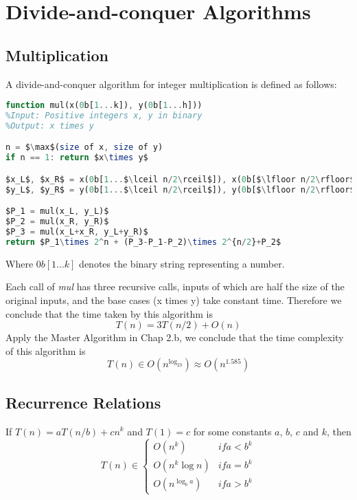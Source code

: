 \section{Divide-and-conquer Algorithms}

\subsection{Multiplication}

\begin{definition}
A divide-and-conquer algorithm for integer multiplication is defined as follows:
\begin{lstlisting}[mathescape=true, language=Octave]
function mul(x(0b[1...k]), y(0b[1...h]))
%Input: Positive integers x, y in binary
%Output: x times y

n = $\max$(size of x, size of y)
if n == 1: return $x\times y$

$x_L$, $x_R$ = x(0b[1...$\lceil n/2\rceil$]), x(0b[$\lfloor n/2\rfloor$...n])
$y_L$, $y_R$ = y(0b[1...$\lceil n/2\rceil$]), y(0b[$\lfloor n/2\rfloor$...n])

$P_1 = mul(x_L, y_L)$
$P_2 = mul(x_R, y_R)$
$P_3 = mul(x_L+x_R, y_L+y_R)$
return $P_1\times 2^n + (P_3-P_1-P_2)\times 2^{n/2}+P_2$
\end{lstlisting}
Where $0b[1...k]$ denotes the binary string representing a number.
\end{definition}
Each call of \textit{mul} has three recursive calls, inputs of which are half the size of the original inputs, and the base cases (x times y) take constant time. Therefore we conclude that the time taken by this algorithm is
\[
T(n) = 3T(n/2)+O(n)
\]
Apply the Master Algorithm in Chap 2.b, we conclude that the time complexity of this algorithm is
\[
T(n) \in O(n^{\log_23}) \approx O(n^{1.585})
\]

\subsection{Recurrence Relations}

\begin{theorem}
If $T(n) = aT(n/b) + cn^k$ and $T(1) = c$ for some constants $a$, $b$, $c$ and $k$, then
\begin{equation*}
T(n) \in \begin{cases}
O(n^k) &if a<b^k \\
O(n^k\log n) &if a=b^k \\
O(n^{\log_ba}) &if a>b^k
\end{cases}
\end{equation*}
\end{theorem}

